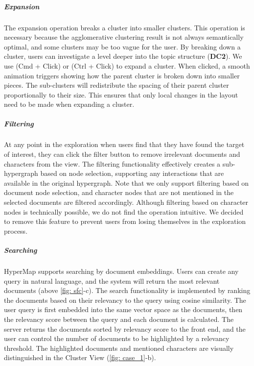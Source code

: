 \vspace*{-0.3cm}
\subparagraph{Expansion}
The expansion operation breaks a cluster into smaller clusters.
This operation is necessary because the agglomerative clustering result is not always semantically optimal, and some clusters may be too vague for the user.
By breaking down a cluster, users can investigate a level deeper into the topic structure (\textbf{DC2}).
We use (Cmd + Click) or (Ctrl + Click) to expand a cluster.
When clicked, a smooth animation triggers showing how the parent cluster is broken down into smaller pieces.
The sub-clusters will redistribute the spacing of their parent cluster proportionally to their size.
This ensures that only local changes in the layout need to be made when expanding a cluster.

\vspace*{-0.3cm}
\subparagraph{Filtering}
At any point in the exploration when users find that they have found the target of interest,
they can click the filter button to remove irrelevant documents and characters from the view.
The filtering functionality effectively creates a sub-hypergraph based on node selection, supporting any interactions that are available in the original hypergraph.
Note that we only support filtering based on document node selection, and character nodes that are not mentioned in the selected documents are filtered accordingly.
Although filtering based on character nodes is technically possible, we do not find the operation intuitive.
We decided to remove this feature to prevent users from losing themselves in the exploration process.

\vspace*{-0.3cm}
\subparagraph{Searching}
HyperMap supports searching by document embeddings.
Users can create any query in natural language, and the system will return the most relevant documents (above \autoref{fig: sfc}-c).
The search functionality is implemented by ranking the documents based on their relevancy to the query using cosine similarity.
The user query is first embedded into the same vector space as the documents, then the relevancy score between the query and each document is calculated.
The server returns the documents sorted by relevancy score to the front end, and the user can control the number of documents to be highlighted by a relevancy threshold. 
The highlighted documents and mentioned characters are visually distinguished in the Cluster View (\autoref{fig: case_1}-b).


